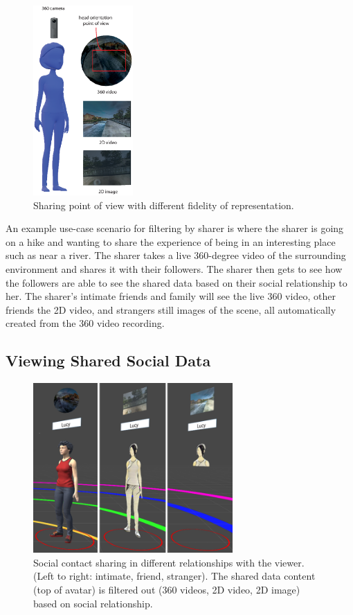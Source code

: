 \begin{figure}[ht]
    \centering
    \includegraphics[width=1.5in]{images/chi/images-04.eps}
    \caption{Sharing point of view with different fidelity of representation.}
    \label{fig:data:sharer}
\end{figure}

An example use-case scenario for filtering by sharer is where the sharer is going on a hike and wanting to share the experience of being in an interesting place such as near a river. The sharer takes a live 360-degree video of the surrounding environment and shares it with their followers. The sharer then gets to see how the followers are able to see the shared data based on their social relationship to her. The sharer's intimate friends and family will see the live 360 video, other friends the 2D video, and strangers still images of the scene, all automatically created from the 360 video recording.

\subsection{Viewing Shared Social Data}

\begin{figure}[ht]
    \centering
    \includegraphics[width=3in]{images/chi/3_levels_of_data.png}
    \caption{Social contact sharing in different relationships with the viewer. (Left to right: intimate, friend, stranger). The shared data content (top of avatar) is filtered out (360 videos, 2D video, 2D image) based on social relationship.}
      \label{fig:data:viewer}
\end{figure}

